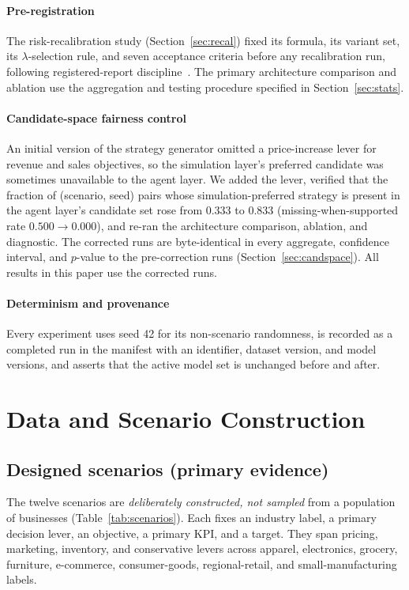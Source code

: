 \documentclass[conference]{IEEEtran}
\begin{document}
\paragraph{Pre-registration}
The risk-recalibration study (Section~\ref{sec:recal}) fixed its formula, its
variant set, its $\lambda$-selection rule, and seven acceptance criteria before
any recalibration run, following registered-report discipline~\cite{Nosek2018}.
The primary architecture comparison and ablation use the aggregation and testing
procedure specified in Section~\ref{sec:stats}.

\paragraph{Candidate-space fairness control}
An initial version of the strategy generator omitted a price-increase lever for
revenue and sales objectives, so the simulation layer's preferred candidate was
sometimes unavailable to the agent layer. We added the lever, verified that the
fraction of (scenario, seed) pairs whose simulation-preferred strategy is
present in the agent layer's candidate set rose from $0.333$ to $0.833$
(missing-when-supported rate $0.500 \rightarrow 0.000$), and re-ran the
architecture comparison, ablation, and diagnostic. The corrected runs are
byte-identical in every aggregate, confidence interval, and $p$-value to the
pre-correction runs (Section~\ref{sec:candspace}). All results in this paper use
the corrected runs.

\paragraph{Determinism and provenance}
Every experiment uses seed 42 for its non-scenario randomness, is recorded as a
completed run in the manifest with an identifier, dataset version, and model
versions, and asserts that the active model set is unchanged before and after.

\section{Data and Scenario Construction}
\label{sec:data}

\subsection{Designed scenarios (primary evidence)}
The twelve scenarios are \emph{deliberately constructed, not sampled} from a
population of businesses (Table~\ref{tab:scenarios}). Each fixes an industry
label, a primary decision lever, an objective, a primary KPI, and a target. They
span pricing, marketing, inventory, and conservative levers across apparel,
electronics, grocery, furniture, e-commerce, consumer-goods, regional-retail,
and small-manufacturing labels.
\end{document}
